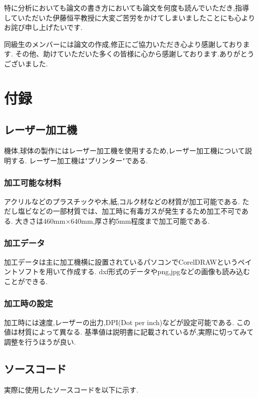 \documentclass[12pt,oneside]{sotsuken_paper}
\begin{document}
特に分析においても論文の書き方においても論文を何度も読んでいただき,指導していただいた伊藤恒平教授に大変ご苦労をかけてしまいましたことにも心よりお詫び申し上げたいです.


同級生のメンバーには論文の作成,修正にご協力いただき心より感謝しております.
その他、助けていただいた多くの皆様に心から感謝しております.ありがとうございました.


\chapter*{付録}

\section{レーザー加工機}
機体,球体の製作にはレーザー加工機を使用するため,レーザー加工機について説明する.
レーザー加工機は"プリンター"である.

\subsection{加工可能な材料}
アクリルなどのプラスチックや木,紙,コルク材などの材質が加工可能である.
ただし塩ビなどの一部材質では、加工時に有毒ガスが発生するため加工不可である.
大きさは460mm×640mm,厚さ約5mm程度まで加工可能である.

\subsection{加工データ}
加工データは主に加工機横に設置されているパソコンでCorelDRAWというペイントソフトを用いて作成する.
dxf形式のデータやpng,jpgなどの画像も読み込むことができる.

\subsection{加工時の設定}
加工時には速度,レーザーの出力,DPI(Dot per inch)などが設定可能である.
この値は材質によって異なる.
基準値は説明書に記載されているが,実際に切ってみて調整を行うほうが良い.

\section{ソースコード}
実際に使用したソースコードを以下に示す.
\end{document}
